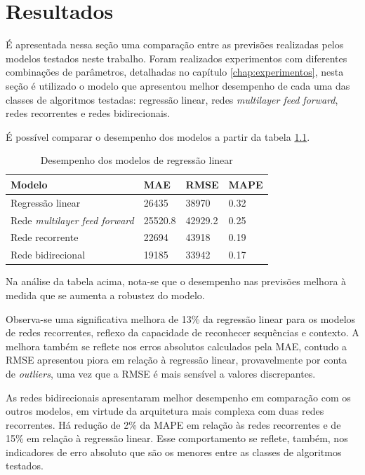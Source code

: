 
\chapter{Resultados}
\label{chap:resultados}

É apresentada nessa seção uma comparação entre as previsões realizadas pelos modelos
testados neste trabalho. Foram realizados experimentos com diferentes 
combinações de parâmetros, detalhadas no capítulo \ref{chap:experimentos},
nesta seção é utilizado o modelo que apresentou melhor desempenho de cada uma 
das classes de algoritmos testadas: regressão linear, redes \textit{multilayer feed forward},
redes recorrentes e redes bidirecionais.

É possível comparar o desempenho dos modelos a partir da tabela \ref{tab:compara_modelos}.

\begin{table}[H]
    \centering
    \begin{tabular}{llll}
        \toprule
        Modelo & MAE     & RMSE    & MAPE \\
        \midrule
        Regressão linear & 26435 & 38970 & 0.32  \\
        Rede \textit{multilayer feed forward} & 25520.8 & 42929.2 & 0.25  \\
        Rede recorrente & 22694 & 43918 & 0.19  \\
        Rede bidirecional & 19185 & 33942 & 0.17 \\
        \bottomrule
    \end{tabular}
    \caption{Desempenho dos modelos de regressão linear}
    \label{tab:compara_modelos}
\end{table}

Na análise da tabela acima, nota-se que o desempenho nas previsões
melhora à medida que se aumenta a robustez do modelo.

Observa-se uma significativa melhora de 13\% da regressão linear para os modelos
de redes recorrentes, reflexo da capacidade de reconhecer sequências e contexto.
A melhora também se reflete nos erros absolutos calculados pela MAE, contudo a 
RMSE apresentou piora em relação à regressão linear, provavelmente por conta 
de \textit{outliers}, uma vez que a RMSE é mais sensível a valores discrepantes.

As redes bidirecionais apresentaram melhor desempenho em comparação com os outros 
modelos, em virtude da arquitetura mais complexa com duas redes recorrentes. Há 
redução de 2\% da MAPE em relação às redes recorrentes e de 15\% em relação à 
regressão linear. Esse comportamento se reflete, também, nos indicadores de 
erro absoluto que são os menores entre as classes de algoritmos testados.

